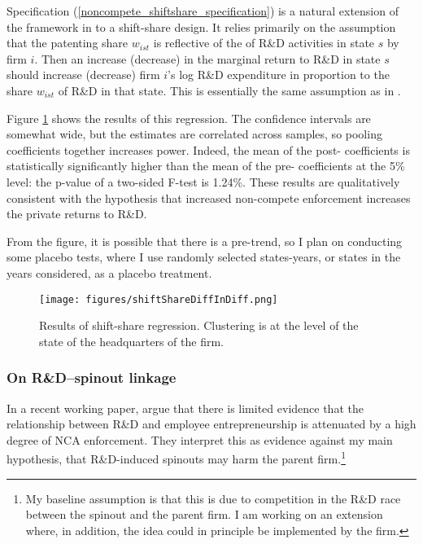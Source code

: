 \documentclass[11pt,english]{article}
\theoremstyle{remark}
\begin{document}
Specification (\ref{noncompete_shiftshare_specification}) is a natural extension of the framework in \cite{jeffers_impact_2018} to a shift-share design. It relies primarily on the assumption that the patenting share $w_{ist}$ is reflective of the of R\&D activities in state $s$ by firm $i$. Then an increase (decrease) in the marginal return to R\&D in state $s$ should increase (decrease) firm $i$'s log R\&D expenditure in proportion to the share $w_{ist}$ of R\&D in that state. This is essentially the same assumption as in \cite{bloom_identifying_2013}.

Figure \ref{shiftShare_results} shows the results of this regression. The confidence intervals are somewhat wide, but the estimates are correlated across samples, so pooling coefficients together increases power. Indeed, the mean of the post- coefficients is statistically significantly higher than the mean of the pre- coefficients at the 5\% level: the p-value of a two-sided F-test is 1.24\%. These results are qualitatively consistent with the hypothesis that increased non-compete enforcement increases the private returns to R\&D. 

From the figure, it is possible that there is a pre-trend, so I plan on conducting some placebo tests, where I use randomly selected states-years, or states in the years considered, as a placebo treatment. 

\begin{figure}[p]
	\centering
	\texttt{[image: figures/shiftShareDiffInDiff.png]}
	\caption{Results of shift-share regression. Clustering is at the level of the state of the headquarters of the firm.}
	\label{shiftShare_results}
\end{figure}



\subsubsection{On R\&D--spinout linkage}

In a recent working paper, \cite{babina_entrepreneurial_2018} argue that there is limited evidence that the relationship between R\&D and employee entrepreneurship is attenuated by a high degree of NCA enforcement. They interpret this as evidence against my main hypothesis, that R\&D-induced spinouts may harm the parent firm.\footnote{My baseline assumption is that this is due to competition in the R\&D race between the spinout and the parent firm. I am working on an extension where, in addition, the idea could in principle be implemented by the firm.}
\end{document}
